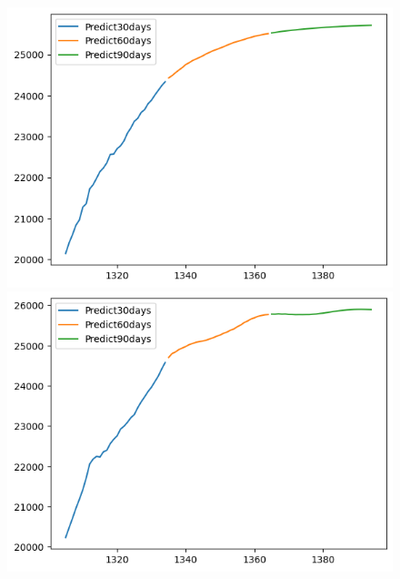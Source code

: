 \begin{figure}[H]
\begin{minipage}{0.15\textwidth}
    \includegraphics[width=1\textwidth]{resources/chapter-5/newdata1/predicted/EIB_ RNN_7-3_30days.png}
    \end{minipage}
    \hfill
    \begin{minipage}{0.15\textwidth}
    \centering
    \includegraphics[width=1\textwidth]{resources/chapter-5/newdata1/predicted/EIB_ RNN_8-2_30days.png}
    \end{minipage}
    \hfill
        \begin{minipage}{0.15\textwidth}
    \centering

\end{minipage}
\end{figure}
